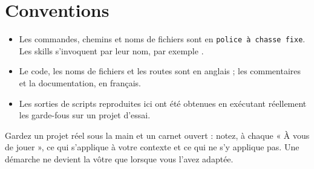\section*{Conventions}
\begin{itemize}
  \item Les commandes, chemins et noms de fichiers sont en \texttt{police à chasse fixe}. Les skills s'invoquent par leur nom, par exemple .
  \item Le code, les noms de fichiers et les routes sont en anglais ; les commentaires et la documentation, en français.
  \item Les sorties de scripts reproduites ici ont été obtenues en exécutant réellement les garde-fous sur un projet d'essai.
\end{itemize}

\begin{retenir}
Gardez un projet réel sous la main et un carnet ouvert : notez, à chaque « À vous de jouer »,
ce qui s'applique à votre contexte et ce qui ne s'y applique pas. Une démarche ne devient la
vôtre que lorsque vous l'avez adaptée.
\end{retenir}
